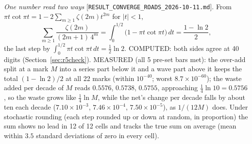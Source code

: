 \documentclass[11pt]{article}
\newcommand{\rec}[1]{\nolinkurl{#1}}
\begin{document}
\medskip
\noindent\emph{One number read two ways} [\rec{RESULT_CONVERGE_ROADS_2026-10-11.md}]. From $\pi t\cot\pi t=1-2\sum_{m\ge1}\zeta(2m)t^{2m}$ for $|t|<1$,
\[
\sum_{m\ge1}\frac{\zeta(2m)}{(2m+1)\,4^m}=\int_0^{1/2}\bigl(1-\pi t\cot\pi t\bigr)\,dt=\frac{1-\ln2}{2},
\]
the last step by $\int_0^{1/2}\pi t\cot\pi t\,dt=\frac12\ln2$. COMPUTED: both sides agree at 40 digits (Section~\ref{sec:r5check}). MEASURED (all 5 pre-set bars met): the over-add split at a mark $M$ into a series part below it and a wave part above it keeps the total $(1-\ln2)/2$ at all 22 marks (within $10^{-40}$; worst $8.7\times10^{-60}$); the waste added per decade of $M$ reads $0.5576$, $0.5738$, $0.5755$, approaching $\frac14\ln10=0.5756$, so the waste grows like $\frac14\ln M$, while the net's change per decade falls by about ten each decade ($7.10\times10^{-3}$, $7.46\times10^{-4}$, $7.50\times10^{-5}$), as $1/(12M)$ does. Under stochastic rounding (each step rounded up or down at random, in proportion) the sum shows no lead in 12 of 12 cells and tracks the true sum on average (mean within $3.5$ standard deviations of zero in every cell).
\end{document}
